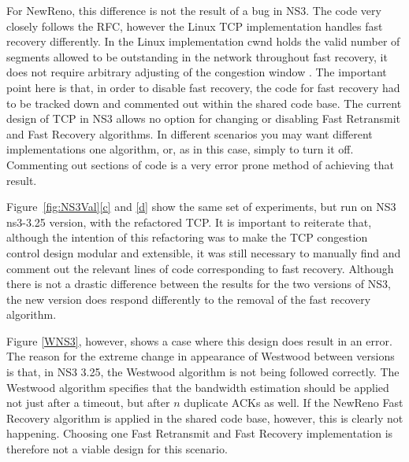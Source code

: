 \documentclass[conference]{IEEEtran}
\begin{document}
For NewReno, this difference is not the result of a bug in NS3. The code very closely follows the RFC, however the Linux TCP implementation handles fast recovery differently. In the Linux implementation cwnd holds the valid number of segments allowed to be outstanding in the network throughout fast recovery, it does not require arbitrary adjusting of the congestion window \cite{NS3Val} \cite{LinuxTCP}. The important point here is that, in order to disable fast recovery, the code for fast recovery had to be tracked down and commented out within the shared code base. The current design of TCP in NS3 allows no option for changing or disabling Fast Retransmit and Fast Recovery algorithms. In different scenarios you may want different implementations one algorithm, or, as in this case, simply to turn it off. Commenting out sections of code is a very error prone method of achieving that result. 

Figure~\ref{fig:NS3Val}\ref{c} and \ref{d} show the same set of experiments, but run on NS3 ns3-3.25 version, with the refactored TCP. It is important to reiterate that, although the intention of this refactoring was to make the TCP congestion control design modular and extensible, it was still necessary to manually find and comment out the relevant lines of code corresponding to fast recovery. Although there is not a drastic difference between the results for the two versions of NS3, the new version does respond differently to the removal of the fast recovery algorithm. %

Figure \ref{WNS3}, however, shows a case where this design does result in an error. The reason for the extreme change in appearance of Westwood between versions is that, in NS3 3.25, the Westwood algorithm is not being followed correctly. The Westwood algorithm specifies that the bandwidth estimation should be applied not just after a timeout, but after $n$ duplicate ACKs as well. If the NewReno Fast Recovery algorithm is applied in the shared code base, however, this is clearly not happening. Choosing one Fast Retransmit and Fast Recovery implementation is therefore not a viable design for this scenario. 
\end{document}
